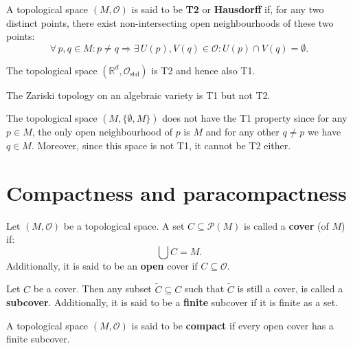 \documentclass[root.tex]{subfiles}
\begin{document}
\begin{mydef}
A topological space $(M,\mathcal{O})$ is said to be \textbf{T2} or \textbf{Hausdorff} if, for any two distinct points, there exist non-intersecting open neighbourhoods of these two points:
$$
\forall \, p,q\in M : p\neq q \Rightarrow \exists \, U(p),V(q)\in \mathcal{O} : U(p)\cap V(q) = \emptyset.
$$
\end{mydef}
%
\begin{myex}
  The topological space $(\mathbb{R}^d,\mathcal{O}_\mathrm{std})$ is T2 and hence also T1.
\end{myex}

\begin{myex}
The Zariski topology on an algebraic variety is T1 but not T2.
\end{myex}

\begin{myex}
The topological space $(M,\{\emptyset,M\})$ does not have the T1 property since for any $p \in M$, the only open neighbourhood of $p$ is $M$ and for any other $q\neq p$ we have $q\in M$. Moreover, since this space is not T1, it cannot be T2 either.
\end{myex}

\section{Compactness and paracompactness}

\begin{mydef}
  Let $(M,\mathcal{O})$ be a topological space. A set $C \subseteq \mathcal{P}(M)$ is called a \textbf{cover} (of $M$) if:
$$
\bigcup C = M.
$$
Additionally, it is said to be an \textbf{open} cover if $C \subseteq \mathcal{O}$.
\end{mydef}

\begin{mydef}
Let $C$ be a cover. Then any subset $\widetilde{C}\subseteq C$ such that $\widetilde{C}$ is still a cover, is called a \textbf{subcover}. Additionally, it is said to be a \textbf{finite} subcover if it is finite as a set.
\end{mydef}

\begin{mydef}
A topological space $(M,\mathcal{O})$ is said to be \textbf{compact} if every open cover has a finite subcover.
\end{mydef}
\end{document}
